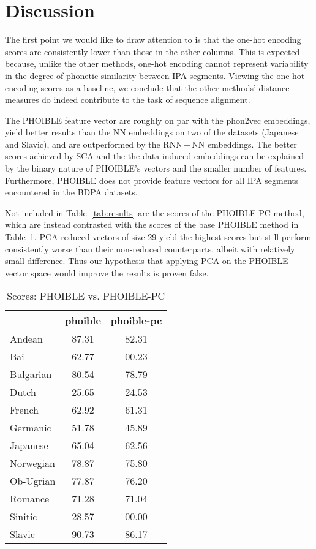 \documentclass[a4paper]{report}
\begin{document}
\section{Discussion}

The first point we would like to draw attention to is that the one-hot encoding scores are consistently lower than those in the other columns.
This is expected because, unlike the other methods, one-hot encoding cannot represent variability in the degree of phonetic similarity between IPA segments.
Viewing the one-hot encoding scores as a baseline, we conclude that the other methods' distance measures do indeed contribute to the task of sequence alignment.

The PHOIBLE feature vector are roughly on par with the phon2vec embeddings,
yield better results than the NN embeddings on two of the datasets (Japanese and Slavic), and are outperformed by the RNN\,+\,NN embeddings.
The better scores achieved by SCA and the the data-induced embeddings can be explained by the binary nature of PHOIBLE's vectors and the smaller number of features.
Furthermore, PHOIBLE does not provide feature vectors for all IPA segments encountered in the BDPA datasets.

Not included in Table~\ref{tab:results} are the scores of the PHOIBLE-PC method,
which are instead contrasted with the scores of the base PHOIBLE method in Table~\ref{tab:results-phoible}.
PCA-reduced vectors of size 29 yield the highest scores
but still perform consistently worse than their non-reduced counterparts, albeit with relatively small difference.
Thus our hypothesis that applying PCA on the PHOIBLE vector space would improve the results is proven false.

\begin{table}[h]
	\centering\small
	\begin{tabular}{l *{2}{c}}
		\toprule
		& phoible & phoible-pc \\
		\midrule
		Andean		&	87.31 &	82.31 \\
		Bai			&	62.77 &	00.23 \\
		Bulgarian	&	80.54 &	78.79 \\
		Dutch		&	25.65 &	24.53 \\
		French		&	62.92 &	61.31 \\
		Germanic	&	51.78 &	45.89 \\
		Japanese	&	65.04 &	62.56 \\
		Norwegian	&	78.87 &	75.80 \\
		Ob-Ugrian	&	77.87 &	76.20 \\
		Romance		&	71.28 &	71.04 \\
		Sinitic		&	28.57 &	00.00 \\
		Slavic		&	90.73 &	86.17 \\
		\bottomrule
	\end{tabular}
	\caption{Scores: PHOIBLE vs. PHOIBLE-PC}
	\label{tab:results-phoible}
\end{table}
\end{document}
